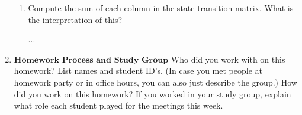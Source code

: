 \documentclass[11pt]{article}
\begin{document}
\begin{enumerate}
\begin{enumerate}
    
    \item Compute the sum of each column in the state transition matrix. What is the interpretation of this?
    \begin{Answer}
        ...
    \end{Answer}
   \end{enumerate}
   
   
   \newpage
   \item $\textbf{Homework Process and Study Group}$
        Who did you work with on this homework? List names and student ID’s. (In case you met people at homework party or in office hours, you can also just describe the group.) How did you work on this homework? If you worked in your study group, explain what role each student played for the meetings this week.
        
        \begin{Answer}
            
        \end{Answer}
    \end{enumerate}


\newpage
\end{document}
